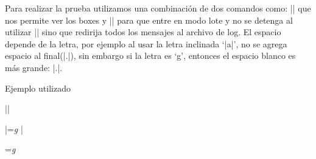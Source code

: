 


\bigskip


\bigskip

\respuestaS Para realizar la prueba utilizamos una combinaci\'on de
dos comandos como: |\showbox| que nos permite ver los boxes y
|\batchmode| para que entre en modo lote y no se detenga al utilizar
|\showbox| sino que redirija todos los mensajes al archivo de log. El
espacio depende de la letra, por ejemplo al usar la letra inclinada
`|a|', no se agrega espacio al final(|.|), sin embargo si la
letra es `g', entonces el espacio blanco es más grande: |.|.

\medskip

Ejemplo utilizado

|\batchmode |

|=\hbox{\sl g\/} |

\batchmode %
=\hbox{\sl g\/} 

\bye

